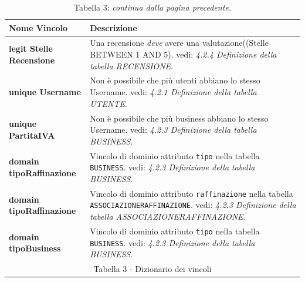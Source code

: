 \documentclass[a4paper,12pt]{article}
\begin{document}
\newpage\null{}\setcounter{page}{9}
\vspace{-2cm}
\begin{flushleft}
\begin{table}[htbp]
\caption*{Tabella 3: {\it continua dalla pagina precedente.}}
\begin{tabular}[c]{| m{6cm} | m{10cm} |}
\hline
\bf Nome Vincolo&\bf Descrizione\\
\hline
{\bf legit Stelle Recensione}
&\small Una recensione {\it deve} avere una valutazione((Stelle BETWEEN 1 AND 5).
vedi: {\it 4.2.4 Definizione della tabella RECENSIONE}.
\\
\hline

{\bf unique Username}
&\small Non è possibile che più utenti abbiano lo stesso Username.
vedi: {\it 4.2.1 Definizione della tabella UTENTE}.
\\
\hline

{\bf unique PartitaIVA}
&\small Non è possibile che più business abbiano lo stesso Username.
vedi: {\it 4.2.3 Definizione della tabella BUSINESS}.
\\
\hline

{\bf domain tipoRaffinazione}
&\small Vincolo di dominio attributo \verb|tipo| nella tabella \verb|BUSINESS|.
vedi: {\it 4.2.3 Definizione della tabella BUSINESS}.
\\
\hline

{\bf domain tipoRaffinazione}
&\small Vincolo di dominio attributo \verb|raffinazione| nella tabella \verb|ASSOCIAZIONERAFFINAZIONE|.
vedi: {\it 4.2.3 Definizione della tabella ASSOCIAZIONERAFFINAZIONE}.
\\
\hline

{\bf domain tipoBusiness}
&\small Vincolo di dominio attributo \verb|tipo| nella tabella \verb|BUSINESS|.
vedi: {\it 4.2.3 Definizione della tabella BUSINESS}.
\\
\hline
\multicolumn{2}{c}{\footnotesize{\normalsize Tabella 3 - Dizionario dei vincoli}}
\end{tabular}
\end{table}
\end{flushleft}
\newpage
\end{document}
